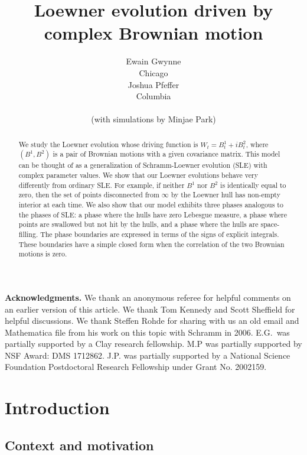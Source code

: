 \documentclass[11pt]{article}
\title{Loewner evolution driven by complex Brownian motion
}
\author{ \begin{tabular}{c}{Ewain Gwynne}\\[-4pt]\small Chicago\end{tabular}\qquad  \begin{tabular}{c}{Joshua Pfeffer}\\[-4pt]\small Columbia\end{tabular}\\
\hspace{6pt}
(with simulations by Minjae Park)
}
\date{   }
\theoremstyle{plain}
\theoremstyle{definition}
\numberwithin{equation}{section}
\begin{document}
\maketitle 

\begin{abstract}
We study the Loewner evolution whose driving function is $W_t = B_t^1 + i B_t^2$, where $(B^1,B^2)$ is a pair of Brownian motions with a given covariance matrix. This model can be thought of as a generalization of Schramm-Loewner evolution (SLE) with complex parameter values. We show that our Loewner evolutions behave very differently from ordinary SLE. For example, if neither $B^1$ nor $B^2$ is identically equal to zero, then the set of points disconnected from $\infty$ by the Loewner hull has non-empty interior at each time. We also show that our model exhibits three phases analogous to the phases of SLE: a phase where the hulls have zero Lebesgue measure, a phase where points are swallowed but not hit by the hulls, and a phase where the hulls are space-filling. The phase boundaries are expressed in terms of the signs of explicit integrals. These boundaries have a simple closed form when the correlation of the two Brownian motions is zero.
\end{abstract}


\tableofcontents



\bigskip
 
\noindent\textbf{Acknowledgments.} We thank an anonymous referee for helpful comments on an earlier version of this article. We thank Tom Kennedy and Scott Sheffield for helpful discussions. We thank Steffen Rohde for sharing with us an old email and Mathematica file from his work on this topic with Schramm in 2006. E.G.\ was partially supported by a Clay research fellowship. M.P was partially supported by NSF Award: DMS 1712862. J.P. was
partially supported by a National Science Foundation Postdoctoral Research Fellowship under Grant
No. 2002159.



\section{Introduction}
\label{sec-intro}

\subsection{Context and motivation}
\end{document}
